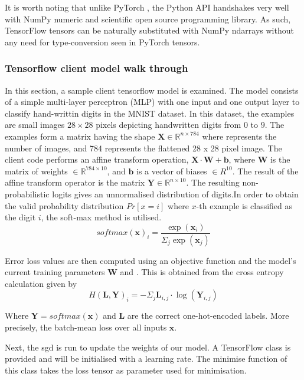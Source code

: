 It is worth noting that unlike PyTorch \citep{ketkar2017introduction}, the Python API handshakes very well with NumPy\citep{numpy} numeric and scientific open source programming library. As such, TensorFlow tensors can be naturally substituted with NumPy ndarrays without any need for type-conversion seen in PyTorch tensors.

\subsubsection{Tensorflow client model walk through}\label{sec_c3_tfw}
In this section, a sample client tensorflow model is examined. The model consists of a simple multi-layer perceptron (MLP) with one input and one output layer to classify hand-writtin digits in the MNIST\citep{krizhevsky2012imagenet} dataset.   In this dataset, the examples are small images $28 \times 28$ pixels depicting handwritten digits from $0$ to $9$.  The examples form a matrix having the shape $\mathbf{X}\in\mathbb{R}^{n\times 784}$ where  represents the number of images, and 784 represents the flattened 28 x 28 pixel image.  The client code performs an affine transform operation, $\mathbf{X\cdot W+b}$, where $\mathbf{W}$ is the matrix of weights $\in \mathbb{R}^{784 \times 10}$, and $\mathbf{b}$ is a vector of biases  $\in R^{10}$.  The result of the affine transform operator is the matrix $\mathbf{Y}\in \mathbb{R}^{n\times 10}$. The resulting non-probabilistic logits gives an unnormalised distribution of digits.In order to obtain the valid probability distribution $Pr[x=i]$ where $x$-th example is classified as the digit $i$, the soft-max method is utilised. 
\begin{equation}
softmax(\mathbf{x})_i=\frac{\exp(\mathbf{x}_i)}{\Sigma_j\exp(\mathbf{x}_j)}\label{eqn_c3_smax00}
\end{equation} 

Error loss values are then computed using an objective function and the model’s current training parameters $\mathbf{W}$ and .  This is obtained from the cross entropy calculation given by
\begin{equation}
    H(\mathbf{L,Y})_i=−\Sigma_j\mathbf{L}_{i,j}\cdot\log(\mathbf{Y}_{i,j})
\end{equation}

Where $\mathbf{Y}=softmax(\mathbf{x})$ and $\mathbf{L}$ are the correct one-hot-encoded labels.  More precisely, the batch-mean loss over all inputs $\mathbf{x}$.


Next, the \acrfull{sgd} is run to update the weights of our model.  A TensorFlow class is provided and will be initialised with a learning rate.  The minimise function of this class takes the loss tensor as parameter used for minimisation.

